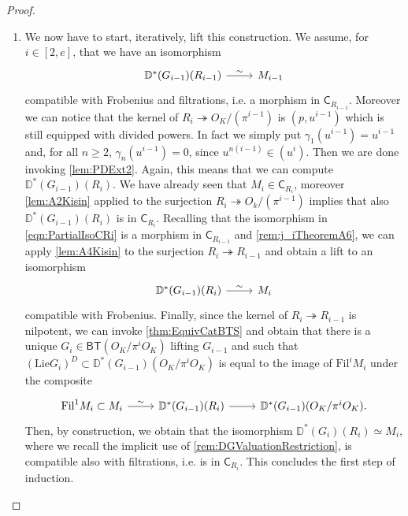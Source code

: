 \begin{proof}
\begin{enumerate}
\item We now have to start, iteratively, lift this construction.
	We assume, for $i \in [2,e]$, that we have an isomorphism
	\begin{equation}\label{eqn:PartialIsoCRi}
	\begin{tikzcd}
	\mathbb{D}^*(G_{i-1})(R_{i-1}) 
	\arrow[r, "\sim", rightarrow] &
	M_{i-1}
	\end{tikzcd}
	\end{equation}
	compatible with Frobenius and filtrations, i.e. a morphism in $\mathsf{C}_{R_{i-1}}$.
	Moreover we can notice that the kernel of $R_i \twoheadrightarrow O_K/ (\pi^{i-1})$
	is $(p, u^{i-1})$ which is still equipped with divided powers.
	In fact we simply put $\gamma_1(u^{i-1}) = u^{i-1}$ and, for all $n \geq 2$,
	$\gamma_n(u^{i-1}) = 0$, since $u^{n(i-1)} \in (u^i)$.
	Then we are done invoking \cref{lem:PDExt2}.
	Again, this means that we can compute $\mathbb{D}^*(G_{i-1})(R_i)$.
	We have already seen that $M_i \in \mathsf{C}_{R_i}$, moreover \cref{lem:A2Kisin}
	applied to the surjection $R_i \twoheadrightarrow O_k/ (\pi^{i-1})$ implies that
	also $\mathbb{D}^*(G_{i-1})(R_i)$ is in $\mathsf{C}_{R_i}$.
	Recalling that the isomorphism in \cref{eqn:PartialIsoCRi}
	is a morphism in $\mathsf{C}_{R_{i-1}}$ and \cref{rem:j_iTheoremA6}, 
	we can apply \cref{lem:A4Kisin} to the surjection $R_i \twoheadrightarrow R_{i-1}$
	and obtain a lift to an isomorphism
	\begin{equation*}
	\begin{tikzcd}
	\mathbb{D}^*(G_{i-1})(R_{i}) 
	\arrow[r, "\sim", rightarrow] &
	M_{i}
	\end{tikzcd}
	\end{equation*}
	compatible with Frobenius.
	Finally, since the kernel of $R_i \twoheadrightarrow R_{i-1}$ is nilpotent,
	we can invoke \cref{thm:EquivCatBTS} and obtain that
	there is a unique $G_i \in \mathsf{BT}(O_K/\pi^iO_K)$
	lifting $G_{i-1}$ and such that $(\mathrm{Lie}G_i)^D \subset \mathbb{D}^*(G_{i-1})(O_K/\pi^i O_K)$
	is equal to the image of $\mathrm{Fil}^i M_i$ under the composite
	\begin{equation*}
	\begin{tikzcd}
		\mathrm{Fil}^1 M_i \subset M_i
		\arrow[r, "\sim", rightarrow] &
		\mathbb{D}^*(G_{i-1})(R_i)
		\arrow[r, "", rightarrow] &
		\mathbb{D}^*(G_{i-1})(O_K/\pi^iO_K)
	.\end{tikzcd}
	\end{equation*}
	Then, by construction, we obtain that the isomorphism
	$\mathbb{D}^*(G_i)(R_i) \simeq M_i$, where we recall the implicit use of 
	\cref{rem:DGValuationRestriction}, is compatible also with filtrations,
	i.e. is in $\mathsf{C}_{R_i}$.
	This concludes the first step of induction.


\end{enumerate}
\end{proof}

